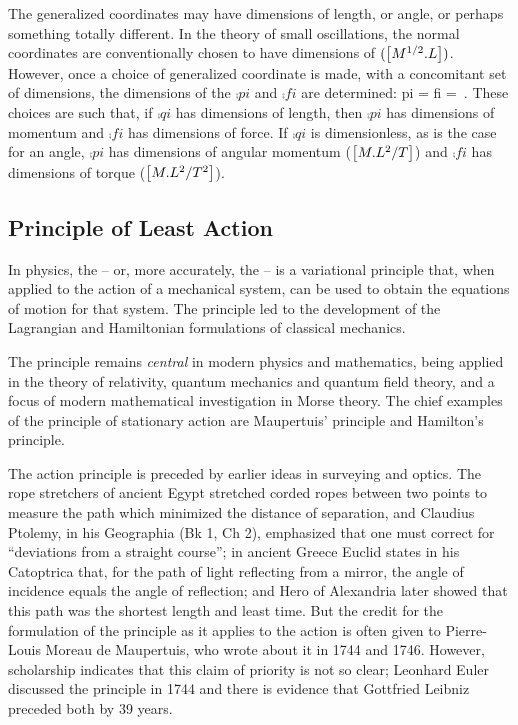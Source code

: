 The generalized coordinates may have dimensions of length, or angle, or perhaps something totally different. In the theory of small oscillations, the normal coordinates are conventionally chosen to have dimensions of $(\left[{M^{1/2}.L}\right])$. However, once a choice of generalized coordinate is made, with a concomitant set of dimensions, the dimensions of the  $\comp pi$ and  $\comp fi$ are determined:
\beq
\dim \comp pi =  \qquad \dim \comp fi 
              = \,.
\eeq
These choices are such that, if $\comp qi$ has dimensions of length, then $\comp pi$ has dimensions of momentum and $\comp fi$ has dimensions of force. If $\comp qi$ is dimensionless, as is the case for an angle, $\comp pi$ has dimensions of angular momentum ($\left[{M.L^2/T}\right]$) and $\comp fi$ has dimensions of torque ($\left[{M.L^2/T^2}\right]$).


\subsection{Principle of Least Action}
In physics, the  -- or, more accurately, the  -- is a variational principle that, when applied to the action of a mechanical system, can be used to obtain the equations of motion for that system. The principle led to the development of the Lagrangian and Hamiltonian formulations of classical mechanics.

The principle remains \emph{central} in modern physics and mathematics, being applied in the theory of relativity, quantum mechanics and quantum field theory, and a focus of modern mathematical investigation in Morse theory. The chief examples of the principle of stationary action are Maupertuis' principle and Hamilton's principle.

The action principle is preceded by earlier ideas in surveying and optics. The rope stretchers of ancient Egypt stretched corded ropes between two points to measure the path which minimized the distance of separation, and Claudius Ptolemy, in his Geographia (Bk 1, Ch 2), emphasized that one must correct for ``deviations from a straight course''; in ancient Greece Euclid states in his Catoptrica that, for the path of light reflecting from a mirror, the angle of incidence equals the angle of reflection; and Hero of Alexandria later showed that this path was the shortest length and least time. But the credit for the formulation of the principle as it applies to the action is often given to Pierre-Louis Moreau de Maupertuis, who wrote about it in 1744 and 1746. However, scholarship indicates that this claim of priority is not so clear; Leonhard Euler discussed the principle in 1744 and there is evidence that Gottfried Leibniz preceded both by 39 years.

